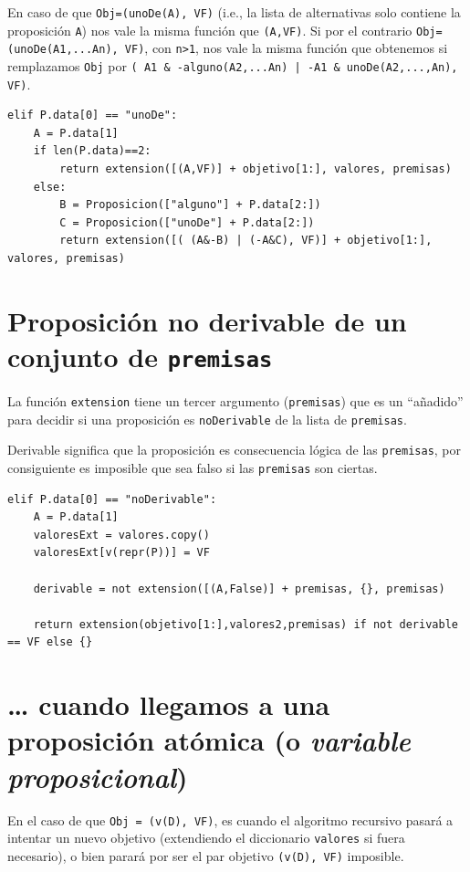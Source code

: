 \documentclass[10pt,a4paper]{report}
\begin{document}
\begin{enumerate}
En caso de que \texttt{Obj=(unoDe(A), VF)} (i.e., la lista de alternativas solo contiene la proposición \texttt{A}) nos vale la misma función que \texttt{(A,VF)}.
Si por el contrario \texttt{Obj=(unoDe(A1,...An), VF)}, con \texttt{n>1}, nos vale la misma función que obtenemos si remplazamos \texttt{Obj} por \texttt{( A1 \& -alguno(A2,...An) | -A1 \& unoDe(A2,...,An), VF)}.
\begin{verbatim}
elif P.data[0] == "unoDe":
    A = P.data[1]
    if len(P.data)==2:
        return extension([(A,VF)] + objetivo[1:], valores, premisas)
    else:
        B = Proposicion(["alguno"] + P.data[2:])
        C = Proposicion(["unoDe"] + P.data[2:])
        return extension([( (A&-B) | (-A&C), VF)] + objetivo[1:], valores, premisas)
\end{verbatim}
\end{enumerate}
\section{Proposición no derivable de un conjunto de \texttt{premisas}}
\label{sec:org7f8fd66}

La función \texttt{extension} tiene un tercer argumento (\texttt{premisas}) que es un ``añadido'' para decidir si una proposición es \texttt{noDerivable} de la lista de \texttt{premisas}.

Derivable significa que la proposición es consecuencia lógica de las \texttt{premisas}, por consiguiente es imposible que sea falso si las \texttt{premisas} son ciertas.

\begin{verbatim}
elif P.data[0] == "noDerivable":
    A = P.data[1]
    valoresExt = valores.copy()
    valoresExt[v(repr(P))] = VF

    derivable = not extension([(A,False)] + premisas, {}, premisas)

    return extension(objetivo[1:],valores2,premisas) if not derivable == VF else {}

\end{verbatim}
\section{\ldots{} cuando llegamos a una proposición atómica (o \emph{variable proposicional})}
\label{sec:org21aa496}

En el caso de que \texttt{Obj = (v(D), VF)}, es cuando el algoritmo recursivo pasará a intentar un nuevo objetivo (extendiendo el diccionario \texttt{valores} si fuera necesario), o bien parará por ser el par objetivo \texttt{(v(D), VF)} imposible.
\end{document}
